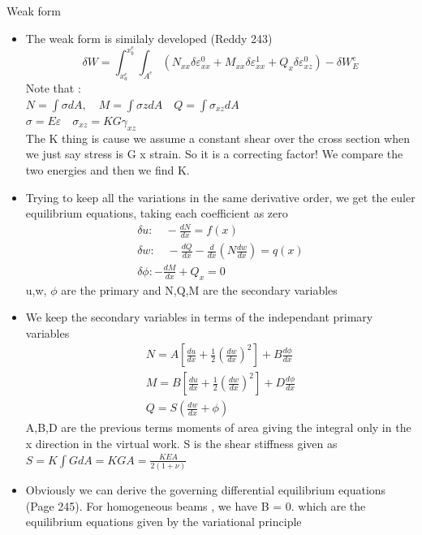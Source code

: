 	\begin{frame}{Weak form}
		\begin{itemize}
			\item The weak form is similaly developed (Reddy 243)
			\begin{equation}
			 \delta W = \int_{x_a^e}^{x_b^e} \int_{A^e} \left(N_{xx} \delta \varepsilon_{xx}^0 + M_{xx}\delta\varepsilon_{xx}^1 + Q_x \delta\varepsilon_{xz}^0 \right) - \delta W_E^e
			\end{equation}
			Note that : \\
			$N = \int \sigma dA, \quad M =  \int \sigma z dA \quad Q =  \int \sigma_{xz}dA$ \\
			$\sigma =  E\varepsilon \quad \sigma_{xz} = KG\gamma_{xz}$
			\\
			The K thing is cause we assume a constant shear over the cross section when we just say stress is G x strain. So it is a correcting factor! We compare the two energies and then we find K.
			\item Trying to keep all the variations in the same derivative order, we get the euler equilibrium equations, taking each coefficient as zero
			\begin{equation}
				\begin{aligned}
					\delta u : \quad -\frac{dN}{dx} = f(x) \\
					\delta w : \quad -\frac{dQ}{dx}  - \frac{d}{dx}\left(N \frac{dw}{dx} \right) = q(x)\\
					\delta\phi : -\frac{dM}{dx} + Q_x = 0
				\end{aligned}
			\end{equation}
			u,w, $\phi$ are the primary and N,Q,M are the secondary variables
		\end{itemize}
	\end{frame}


	\begin{frame}
		\begin{itemize}
			\item We keep the secondary variables in terms of the independant primary variables
			\begin{equation}
			\begin{aligned}
				N = A \left[ \frac{du}{dx} + \frac{1}{2} \left(\frac{dw}{dx} \right)^2\right] + B \frac{d\phi}{dx} \\
				M = B \left[ \frac{du}{dx} + \frac{1}{2} \left(\frac{dw}{dx} \right)^2\right] + D \frac{d\phi}{dx} \\
				Q = S \left(\frac{dw}{dx} + \phi \right)
			\end{aligned}
			\end{equation}
			 A,B,D are the previous terms moments of area giving the integral only in the x direction in the virtual work. S is the shear stiffness given as $S = K \int G dA = K G A =  \frac{KEA}{2(1+ \nu)}$
			 \item  Obviously we can derive the governing differential equilibrium equations (Page 245). For homogeneous beams , we have B = 0. which are the equilibrium equations given by the variational principle
		\end{itemize}
	\end{frame}


